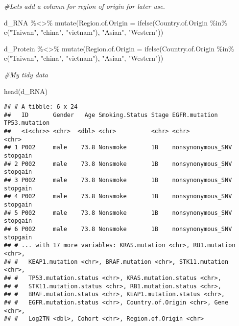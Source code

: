 \documentclass[
]{article}
\newenvironment{Shaded}{\begin{snugshade}}{\end{snugshade}}
\newcommand{\AttributeTok}[1]{\textcolor[rgb]{0.77,0.63,0.00}{#1}}
\newcommand{\CommentTok}[1]{\textcolor[rgb]{0.56,0.35,0.01}{\textit{#1}}}
\newcommand{\FunctionTok}[1]{\textcolor[rgb]{0.00,0.00,0.00}{#1}}
\newcommand{\NormalTok}[1]{#1}
\newcommand{\SpecialCharTok}[1]{\textcolor[rgb]{0.00,0.00,0.00}{#1}}
\newcommand{\StringTok}[1]{\textcolor[rgb]{0.31,0.60,0.02}{#1}}
\begin{document}
\begin{Shaded}
\begin{Highlighting}[]
\CommentTok{\#Let\textquotesingle{}s add a column for \textquotesingle{}region of origin\textquotesingle{} for later use.}

\NormalTok{d\_RNA }\SpecialCharTok{\%\textless{}\textgreater{}\%} 
  \FunctionTok{mutate}\NormalTok{(}\AttributeTok{Region.of.Origin =} \FunctionTok{ifelse}\NormalTok{(Country.of.Origin }\SpecialCharTok{\%in\%} \FunctionTok{c}\NormalTok{(}\StringTok{"Taiwan"}\NormalTok{, }\StringTok{"china"}\NormalTok{, }\StringTok{"vietnam"}\NormalTok{), }\StringTok{"Asian"}\NormalTok{, }\StringTok{"Western"}\NormalTok{))}

\NormalTok{d\_Protein }\SpecialCharTok{\%\textless{}\textgreater{}\%} 
  \FunctionTok{mutate}\NormalTok{(}\AttributeTok{Region.of.Origin =} \FunctionTok{ifelse}\NormalTok{(Country.of.Origin }\SpecialCharTok{\%in\%} \FunctionTok{c}\NormalTok{(}\StringTok{"Taiwan"}\NormalTok{, }\StringTok{"china"}\NormalTok{, }\StringTok{"vietnam"}\NormalTok{), }\StringTok{"Asian"}\NormalTok{, }\StringTok{"Western"}\NormalTok{))}
\end{Highlighting}
\end{Shaded}

\begin{Shaded}
\begin{Highlighting}[]
\CommentTok{\#My tidy data}

\FunctionTok{head}\NormalTok{(d\_RNA)}
\end{Highlighting}
\end{Shaded}

\begin{verbatim}
## # A tibble: 6 x 24
##   ID       Gender   Age Smoking.Status Stage EGFR.mutation     TP53.mutation
##   <I<chr>> <chr>  <dbl> <chr>          <chr> <chr>             <chr>        
## 1 P002     male    73.8 Nonsmoke       1B    nonsynonymous_SNV stopgain     
## 2 P002     male    73.8 Nonsmoke       1B    nonsynonymous_SNV stopgain     
## 3 P002     male    73.8 Nonsmoke       1B    nonsynonymous_SNV stopgain     
## 4 P002     male    73.8 Nonsmoke       1B    nonsynonymous_SNV stopgain     
## 5 P002     male    73.8 Nonsmoke       1B    nonsynonymous_SNV stopgain     
## 6 P002     male    73.8 Nonsmoke       1B    nonsynonymous_SNV stopgain     
## # ... with 17 more variables: KRAS.mutation <chr>, RB1.mutation <chr>,
## #   KEAP1.mutation <chr>, BRAF.mutation <chr>, STK11.mutation <chr>,
## #   TP53.mutation.status <chr>, KRAS.mutation.status <chr>,
## #   STK11.mutation.status <chr>, RB1.mutation.status <chr>,
## #   BRAF.mutation.status <chr>, KEAP1.mutation.status <chr>,
## #   EGFR.mutation.status <chr>, Country.of.Origin <chr>, Gene <chr>,
## #   Log2TN <dbl>, Cohort <chr>, Region.of.Origin <chr>
\end{verbatim}
\end{document}
